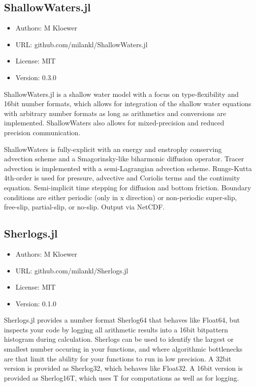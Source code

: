 \subsection{ShallowWaters.jl}

\begin{itemize}
    \setlength\itemsep{-5pt}
    \item Authors: M Kloewer
    \item URL: github.com/milankl/ShallowWaters.jl
    \item License: MIT
    \item Version: 0.3.0
\end{itemize}

ShallowWaters.jl is a shallow water model with a focus on type-flexibility and 16bit number formats, which allows for integration of the shallow water equations with arbitrary number formats as long as arithmetics and conversions are implemented. ShallowWaters also allows for mixed-precision and reduced precision communication.

ShallowWaters is fully-explicit with an energy and enstrophy conserving advection scheme and a Smagorinsky-like biharmonic diffusion operator. Tracer advection is implemented with a semi-Lagrangian advection scheme. Runge-Kutta 4th-order is used for pressure, advective and Coriolis terms and the continuity equation. Semi-implicit time stepping for diffusion and bottom friction. Boundary conditions are either periodic (only in x direction) or non-periodic super-slip, free-slip, partial-slip, or no-slip. Output via NetCDF.

\subsection{Sherlogs.jl}

\begin{itemize}
    \setlength\itemsep{-5pt}
    \item Authors: M Kloewer
    \item URL: github.com/milankl/Sherlogs.jl
    \item License: MIT
    \item Version: 0.1.0
\end{itemize}

Sherlogs.jl provides a number format Sherlog64 that behaves like Float64, but inspects your code by logging all arithmetic results into a 16bit bitpattern histogram during calculation. Sherlogs can be used to identify the largest or smallest number occuring in your functions, and where algorithmic bottlenecks are that limit the ability for your functions to run in low precision. A 32bit version is provided as Sherlog32, which behaves like Float32. A 16bit version is provided as Sherlog16{T}, which uses T for computations as well as for logging.

